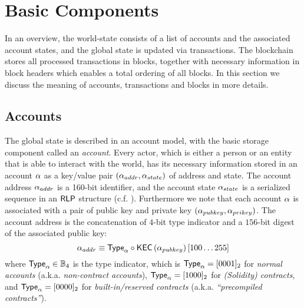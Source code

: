 

\section{Basic Components}
In an overview, the {\name} world-state consists of a list of accounts and the associated account states, and the global state is updated via transactions. 
The {\name} blockchain stores all processed transactions in blocks, together with necessary information in block headers which enables a total ordering of all blocks.
In this section we discuss the meaning of accounts, transactions and blocks in more details.


\subsection{Accounts}
\label{subsec:accounts}

The {\name} global state is described in an account model, with the basic storage component called an \emph{account}.
Every actor, which is either a person or an entity that is able to interact with the {\name} world, has its necessary information stored in an account $\mathbf{\alpha}$  as a key/value pair $(\mathbf{\alpha}_{addr}, \mathbf{\alpha}_{state})$ of address and state.
The account address $\mathbf{\alpha}_{addr}$ is a 160-bit identifier, and the account state $\mathbf{\alpha}_{state}$ is a serialized sequence in an $\mathsf{RLP}$ structure (c.f. \cite{ETH_yellow}).
Furthermore we note that each account $\mathbf{\alpha}$ is associated with a pair of public key and private key $\left(\mathbf{\alpha}_{pubkey}, \mathbf{\alpha}_{prikey}\right)$.
The account address is the concatenation of $4$-bit type indicator and a $156$-bit digest of the associated public key: 
\begin{equation}\label{eq:account-address}
	\mathbf{\alpha}_{addr} \equiv \mathsf{Type}_{\mathbf{\alpha}} \circ \mathsf{KEC} \left( \mathbf{\alpha}_{pubkey} \right)[100\dots 255]
\end{equation}
where $\mathsf{Type}_{\mathbf{\alpha}}\in \mathbb{B}_4$ is the type indicator,
which is $\mathsf{Type}_{\mathbf{\alpha}}=[0001]_2$ for \emph{normal accounts} (a.k.a. \emph{non-contract accounts}), $\mathsf{Type}_{\mathbf{\alpha}}=[1000]_2$ for \emph{(Solidity) contracts},
and $\mathsf{Type}_{\mathbf{\alpha}}=[0000]_2$ for \emph{built-in/reserved contracts} (a.k.a. \emph{``precompiled contracts''}).




